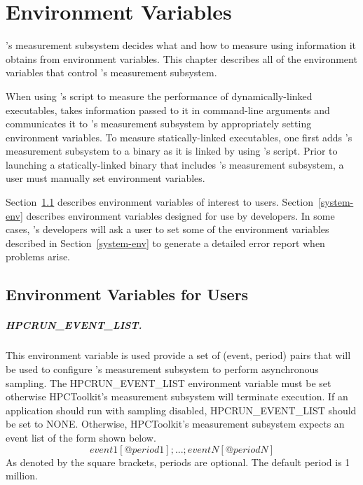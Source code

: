 \newcommand{\parg}{\vspace{1ex}\noindent}

\chapter{Environment Variables}

\HPCToolkit{}'s measurement subsystem decides what and how to measure
using information it obtains from environment variables.  
This chapter describes all of the environment variables that control
\HPCToolkit's measurement subsystem. 

When using
\HPCToolkit{}'s \hpcrun{} script to measure the performance of
dynamically-linked executables, \hpcrun{} takes information passed
to it in command-line arguments and communicates it to \HPCToolkit{}'s
measurement subsystem by appropriately setting environment variables.
To measure statically-linked executables, one first adds \HPCToolkit's
measurement subsystem to a binary as it is linked by using \HPCToolkit's
\hpclink{} script. Prior to launching a statically-linked binary that
includes \HPCToolkit's measurement subsystem, a user 
must manually set environment variables.

Section~\ref{user-env} describes
environment variables of interest to users. Section~\ref{system-env}
describes environment variables designed for use by \HPCToolkit{}
developers. In some cases, \HPCToolkit's developers will ask a user
to set some of the environment variables described in Section~\ref{system-env} to generate a detailed error 
report when problems arise.

\section{Environment Variables for Users}
\label{user-env}

\paragraph{HPCRUN\_EVENT\_LIST.}

This environment variable is used provide a set of (event, period)
pairs that will be used to configure \HPCToolkit's measurement subsystem to perform 
asynchronous sampling.  The HPCRUN\_EVENT\_LIST environment variable
must be set otherwise HPCToolkit's measurement subsystem will terminate
execution. If an application should run with sampling disabled,
HPCRUN\_EVENT\_LIST should be set to NONE. Otherwise, HPCToolkit's
measurement subsystem expects an event list of the form shown below.
$$event1[@period1];...;eventN[@periodN]$$ As denoted by the
square brackets, periods are optional. The default period is 1
million.

